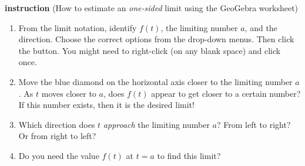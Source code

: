 \documentclass[../main.tex]{subfiles}
\begin{document}
\textbf{instruction} (How to estimate an \emph{one-sided} limit using the GeoGebra worksheet)
\begin{enumerate}[label=(\alph*)]
  \item From the limit notation, identify \(f(t)\), the limiting number \(a\), and the direction. Choose the correct options from the drop-down menus. Then click the  button. You might need to right-click (on any blank space) and click  once.
  \item Move the blue diamond  on the horizontal axis closer to the limiting number \(a\). As \(t\) moves closer to \(a\), does \(f(t)\) appear to get closer to a certain number? If this number exists, then it is the desired limit! %
  \item[\faIcon{comments}] Which direction does \(t\) \emph{approach} the limiting number \(a\)? From left to right? Or from right to left?
  \item[\faIcon{comments}] Do you need the value \(f(t)\) at \(t = a\) to find this limit?
\end{enumerate}
\clearpage
\end{document}
